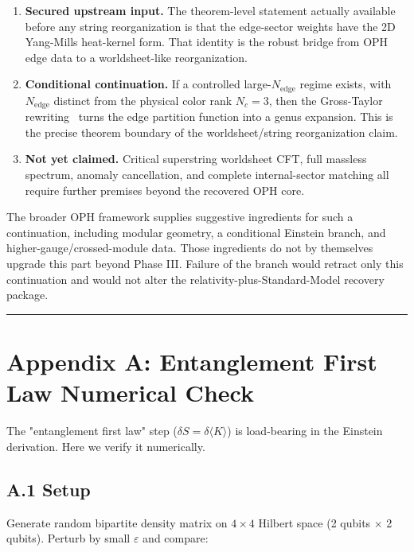 \begin{enumerate}
\def\labelenumi{\arabic{enumi}.}
\item
  \textbf{Secured upstream input.} The theorem-level statement actually available before any string reorganization is that the edge-sector weights have the 2D Yang-Mills heat-kernel form. That identity is the robust bridge from OPH edge data to a worldsheet-like reorganization.
\item
  \textbf{Conditional continuation.} If a controlled large-\(N_{\mathrm{edge}}\) regime exists, with \(N_{\mathrm{edge}}\) distinct from the physical color rank \(N_c=3\), then the Gross-Taylor rewriting~\cite{grossTaylor93} turns the edge partition function into a genus expansion. This is the precise theorem boundary of the worldsheet/string reorganization claim.
\item
  \textbf{Not yet claimed.} Critical superstring worldsheet CFT, full massless spectrum, anomaly cancellation, and complete internal-sector matching all require further premises beyond the recovered OPH core.
\end{enumerate}

The broader OPH framework supplies suggestive ingredients for such a continuation, including
modular geometry, a conditional Einstein branch, and higher-gauge/crossed-module data. Those
ingredients do not by themselves upgrade this part beyond Phase III. Failure of the branch would
retract only this continuation and would not alter the relativity-plus-Standard-Model recovery
package.

\begin{center}\rule{0.5\linewidth}{0.5pt}\end{center}

\section{Appendix A: Entanglement First Law Numerical Check}\label{appendix-a-entanglement-first-law-numerical-check}

The "entanglement first law" step (\(\delta S = \delta\langle K \rangle\)) is load-bearing in the Einstein derivation. Here we verify it numerically.

\subsection{A.1 Setup}\label{a1-setup}

Generate random bipartite density matrix on \(4 \times 4\) Hilbert space (2 qubits \ensuremath{\times} 2 qubits). Perturb by small \(\varepsilon\) and compare:

